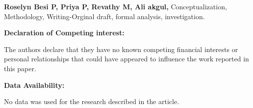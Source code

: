 \documentclass[10pt]{NSP1}
\begin{document}
\textbf{Roselyn Besi P, Priya P, Revathy M, Ali akgul,} Conceptualization, Methodology, Writing-Orginal draft, formal analysis, investigation.

\begin{flushleft}
\large\textbf{Declaration of Competing interest:}
\end{flushleft}
The authors declare that they have no known competing financial interests or personal relationships that could have appeared to influence the work reported in this paper.

\begin{flushleft}

\large\textbf{Data Availability:}

No data was used for the research described in the article.

\end{flushleft}
\end{document}
